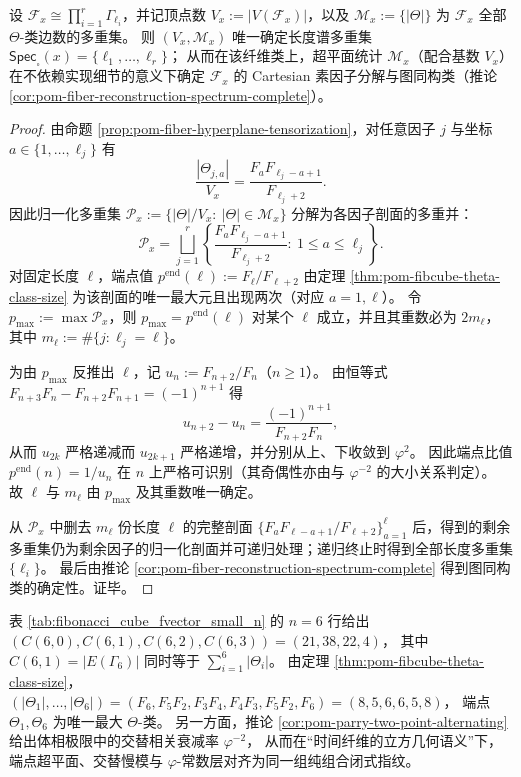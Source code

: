 \begin{corollary}\label{cor:pom-fiber-hyperplane-spectrum-invertibility}
设 \(\mathcal F_x\cong\prod_{i=1}^r\Gamma_{\ell_i}\)，并记顶点数 \(V_x:=|V(\mathcal F_x)|\)，以及 \(\mathcal M_x:=\{|\Theta|\}\) 为 \(\mathcal F_x\) 全部 \(\Theta\)-类边数的多重集。
则 \((V_x,\mathcal M_x)\) 唯一确定长度谱多重集
\(
\mathsf{Spec}_{\square}(x)=\{\ell_1,\dots,\ell_r\}
\)；
从而在该纤维类上，超平面统计 \(\mathcal M_x\)（配合基数 \(V_x\)）在不依赖实现细节的意义下确定 \(\mathcal F_x\) 的 Cartesian 素因子分解与图同构类（推论 \ref{cor:pom-fiber-reconstruction-spectrum-complete}）。
\end{corollary}
\begin{proof}
由命题 \ref{prop:pom-fiber-hyperplane-tensorization}，对任意因子 \(j\) 与坐标 \(a\in\{1,\dots,\ell_j\}\) 有
\[
\frac{|\Theta_{j,a}|}{V_x}=\frac{F_aF_{\ell_j-a+1}}{F_{\ell_j+2}}.
\]
因此归一化多重集
\(
\mathcal P_x:=\{|\Theta|/V_x:\ |\Theta|\in\mathcal M_x\}
\)
分解为各因子剖面的多重并：
\[
\mathcal P_x=\bigsqcup_{j=1}^r \left\{\frac{F_aF_{\ell_j-a+1}}{F_{\ell_j+2}}:\ 1\le a\le \ell_j\right\}.
\]
对固定长度 \(\ell\)，端点值
\(
p^{\mathrm{end}}(\ell):=F_{\ell}/F_{\ell+2}
\)
由定理 \ref{thm:pom-fibcube-theta-class-size} 为该剖面的唯一最大元且出现两次（对应 \(a=1,\ell\)）。
令 \(p_{\max}:=\max\mathcal P_x\)，则 \(p_{\max}=p^{\mathrm{end}}(\ell)\) 对某个 \(\ell\) 成立，并且其重数必为 \(2m_\ell\)，其中 \(m_\ell:=\#\{j:\ell_j=\ell\}\)。
\par
为由 \(p_{\max}\) 反推出 \(\ell\)，记 \(u_n:=F_{n+2}/F_n\)（\(n\ge 1\)）。
由恒等式
\(
F_{n+3}F_n-F_{n+2}F_{n+1}=(-1)^{n+1}
\)
得
\[
u_{n+2}-u_n=\frac{(-1)^{n+1}}{F_{n+2}F_n},
\]
从而 \(u_{2k}\) 严格递减而 \(u_{2k+1}\) 严格递增，并分别从上、下收敛到 \(\varphi^2\)。
因此端点比值 \(p^{\mathrm{end}}(n)=1/u_n\) 在 \(n\) 上严格可识别（其奇偶性亦由与 \(\varphi^{-2}\) 的大小关系判定）。
故 \(\ell\) 与 \(m_\ell\) 由 \(p_{\max}\) 及其重数唯一确定。
\par
从 \(\mathcal P_x\) 中删去 \(m_\ell\) 份长度 \(\ell\) 的完整剖面
\(
\{F_aF_{\ell-a+1}/F_{\ell+2}\}_{a=1}^{\ell}
\)
后，得到的剩余多重集仍为剩余因子的归一化剖面并可递归处理；递归终止时得到全部长度多重集 \(\{\ell_i\}\)。
最后由推论 \ref{cor:pom-fiber-reconstruction-spectrum-complete} 得到图同构类的确定性。证毕。
\end{proof}

\begin{remark}[最小窗 \(m=6\) 的实例化]\label{rem:pom-fiber-hyperplane-m6}
表 \ref{tab:fibonacci_cube_fvector_small_n} 的 \(n=6\) 行给出 \((C(6,0),C(6,1),C(6,2),C(6,3))=(21,38,22,4)\)，
其中 \(C(6,1)=|E(\Gamma_6)|\) 同时等于 \(\sum_{i=1}^{6}|\Theta_i|\)。
由定理 \ref{thm:pom-fibcube-theta-class-size}，
\(
(|\Theta_1|,\dots,|\Theta_6|)=(F_6,F_5F_2,F_3F_4,F_4F_3,F_5F_2,F_6)=(8,5,6,6,5,8)
\)，
端点 \(\Theta_1,\Theta_6\) 为唯一最大 \(\Theta\)-类。
另一方面，推论 \ref{cor:pom-parry-two-point-alternating} 给出体相极限中的交替相关衰减率 \(\varphi^{-2}\)，
从而在“时间纤维的立方几何语义”下，端点超平面、交替慢模与 \(\varphi\)-常数层对齐为同一组纯组合闭式指纹。
\end{remark}

